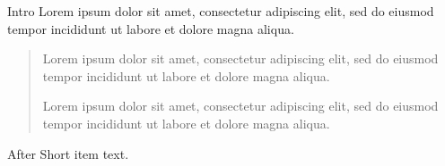 \documentclass[10pt]{article}
\begin{document}
Intro Lorem ipsum dolor sit amet, consectetur adipiscing elit, sed do eiusmod tempor incididunt ut labore et dolore magna aliqua.
\begin{quotation}
Lorem ipsum dolor sit amet, consectetur adipiscing elit, sed do eiusmod tempor incididunt ut labore et dolore magna aliqua.

Lorem ipsum dolor sit amet, consectetur adipiscing elit, sed do eiusmod tempor incididunt ut labore et dolore magna aliqua.
\end{quotation}
After Short item text.
\end{document}
